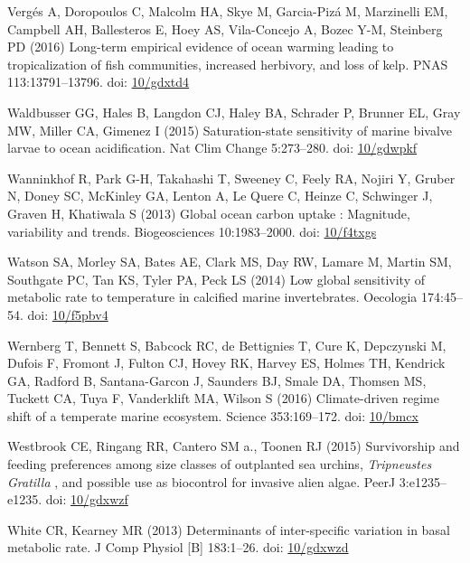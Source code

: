 \documentclass[a4paper,10pt, oneside]{memoir}
\begin{document}
\leavevmode\hypertarget{ref-Verges2016}{}%
Vergés A, Doropoulos C, Malcolm HA, Skye M, Garcia-Pizá M, Marzinelli EM, Campbell AH, Ballesteros E, Hoey AS, Vila-Concejo A, Bozec Y-M, Steinberg PD (2016) Long-term empirical evidence of ocean warming leading to tropicalization of fish communities, increased herbivory, and loss of kelp. PNAS 113:13791--13796. doi: \href{https://doi.org/10/gdxtd4}{10/gdxtd4}

\leavevmode\hypertarget{ref-Waldbusser2015}{}%
Waldbusser GG, Hales B, Langdon CJ, Haley BA, Schrader P, Brunner EL, Gray MW, Miller CA, Gimenez I (2015) Saturation-state sensitivity of marine bivalve larvae to ocean acidification. Nat Clim Change 5:273--280. doi: \href{https://doi.org/10/gdwpkf}{10/gdwpkf}

\leavevmode\hypertarget{ref-Wanninkhof2013}{}%
Wanninkhof R, Park G-H, Takahashi T, Sweeney C, Feely RA, Nojiri Y, Gruber N, Doney SC, McKinley GA, Lenton A, Le Quere C, Heinze C, Schwinger J, Graven H, Khatiwala S (2013) Global ocean carbon uptake : Magnitude, variability and trends. Biogeosciences 10:1983--2000. doi: \href{https://doi.org/10/f4txgs}{10/f4txgs}

\leavevmode\hypertarget{ref-Watson2014}{}%
Watson SA, Morley SA, Bates AE, Clark MS, Day RW, Lamare M, Martin SM, Southgate PC, Tan KS, Tyler PA, Peck LS (2014) Low global sensitivity of metabolic rate to temperature in calcified marine invertebrates. Oecologia 174:45--54. doi: \href{https://doi.org/10/f5pbv4}{10/f5pbv4}

\leavevmode\hypertarget{ref-Wernberg2016}{}%
Wernberg T, Bennett S, Babcock RC, de Bettignies T, Cure K, Depczynski M, Dufois F, Fromont J, Fulton CJ, Hovey RK, Harvey ES, Holmes TH, Kendrick GA, Radford B, Santana-Garcon J, Saunders BJ, Smale DA, Thomsen MS, Tuckett CA, Tuya F, Vanderklift MA, Wilson S (2016) Climate-driven regime shift of a temperate marine ecosystem. Science 353:169--172. doi: \href{https://doi.org/10/bmcx}{10/bmcx}

\leavevmode\hypertarget{ref-Westbrook2015}{}%
Westbrook CE, Ringang RR, Cantero SM a., Toonen RJ (2015) Survivorship and feeding preferences among size classes of outplanted sea urchins, \emph{Tripneustes} \emph{Gratilla} , and possible use as biocontrol for invasive alien algae. PeerJ 3:e1235--e1235. doi: \href{https://doi.org/10/gdxwzf}{10/gdxwzf}

\leavevmode\hypertarget{ref-White2013}{}%
White CR, Kearney MR (2013) Determinants of inter-specific variation in basal metabolic rate. J Comp Physiol {[}B{]} 183:1--26. doi: \href{https://doi.org/10/gdxwzd}{10/gdxwzd}
\end{document}
